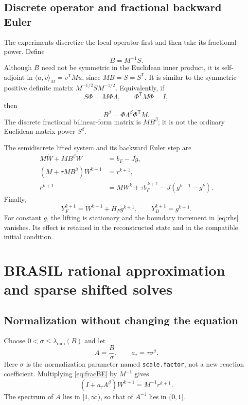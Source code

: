 \documentclass[11pt,a4paper]{article}
\newcommand{\trans}{^{\mathsf T}}
\begin{document}
\subsection{Discrete operator and fractional backward Euler}
The experiments discretize the local operator first and then take its
fractional power. Define
\begin{equation}\label{eq:B}
 B=M^{-1}S.
\end{equation}
Although $B$ need not be symmetric in the Euclidean inner product, it
is self-adjoint in $\langle u,v\rangle_M=v\trans Mu$, since
$MB=S=S\trans$. It is similar to the symmetric positive definite
matrix $M^{-1/2}SM^{-1/2}$.
Equivalently, if
\[
 S\Phi=M\Phi\Lambda,\qquad \Phi\trans M\Phi=I,
\]
then
\[
 B^\beta=\Phi\Lambda^\beta\Phi\trans M.
\]
The discrete fractional bilinear-form matrix is $MB^\beta$;
it is not the ordinary Euclidean matrix power $S^\beta$.

The semidiscrete lifted system and its backward Euler step are
\begin{align}
 M\dot W+MB^\beta W&=b_F-J\dot g,\label{eq:fracsemidiscrete}\\
 (M+\tau MB^\beta)W^{k+1}&=r^{k+1},\label{eq:fracBE}\\
 r^{k+1}&=MW^k+\tau\overline b_F^{\,k+1}
                      -J(g^{k+1}-g^k).\label{eq:rhs}
\end{align}
Finally,
\begin{equation}\label{eq:reconstruct}
 Y_F^{k+1}=W^{k+1}+H_Fg^{k+1},\qquad Y_D^{k+1}=g^{k+1}.
\end{equation}
For constant $g$, the lifting is stationary and the boundary increment
in \eqref{eq:rhs} vanishes. Its effect is retained in the reconstructed
state and in the compatible initial condition.

\section{BRASIL rational approximation and sparse shifted solves}
\subsection{Normalization without changing the equation}
Choose $0<\sigma\leq\lambda_{\min}(B)$ and let
\[
 A=\frac{B}{\sigma},\qquad a_\tau=\tau\sigma^\beta.
\]
Here $\sigma$ is the normalization parameter named
\texttt{scale.factor}, not a new reaction coefficient. Multiplying
\eqref{eq:fracBE} by $M^{-1}$ gives
\begin{equation}\label{eq:normalized}
 (I+a_\tau A^\beta)W^{k+1}=M^{-1}r^{k+1}.
\end{equation}
The spectrum of $A$ lies in $[1,\infty)$, so that of $A^{-1}$ lies in
$(0,1]$.
\end{document}
